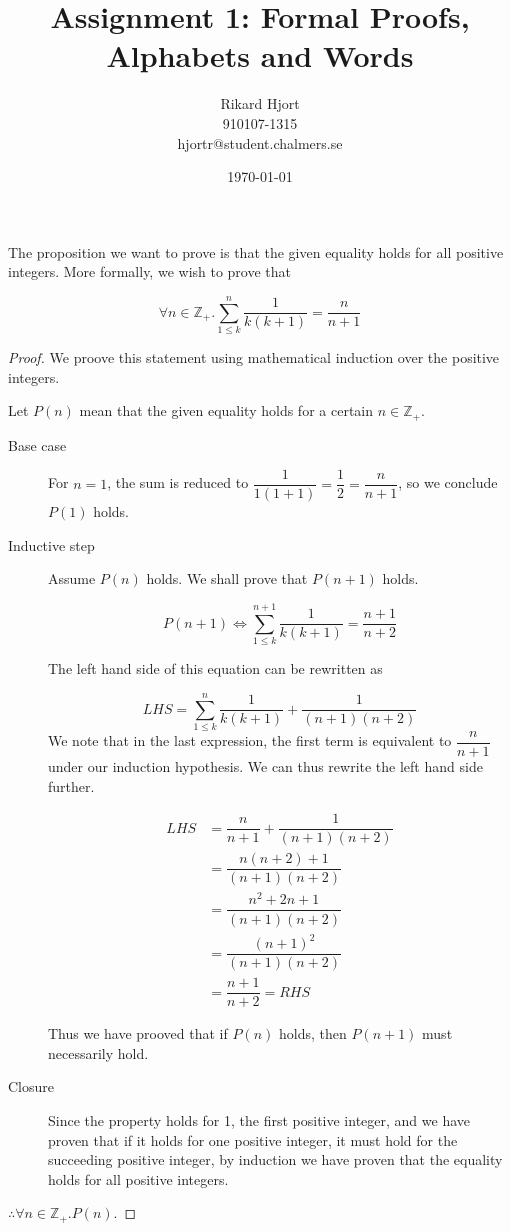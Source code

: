 \documentclass{article}
\title{Assignment 1: Formal Proofs, Alphabets and Words}
\date{\today}
\author{Rikard Hjort\\910107-1315\\hjortr@student.chalmers.se}
\begin{document}
\maketitle
{}


\section{}
The proposition we want to prove is that the given equality holds for all positive integers. More formally, we wish to prove that

$$\forall n \in \mathbb{Z}_+ . \sum_{1\leq k}^n \dfrac{1}{k(k+1)} = \dfrac{n}{n+1}$$

\begin{proof}
    We proove this statement using mathematical induction over the positive integers. 

    Let $P(n)$ mean that the given equality holds for a certain $n \in \mathbb{Z}_+$.

    \begin{description}
        \item[Base case] 
            For $n = 1$, the sum is reduced to $\dfrac{1}{1(1+1)} = \dfrac{1}{2} = \dfrac{n}{n+1}$, so we conclude $P(1)$ holds.
        \item[Inductive step] 
            Assume $P(n)$ holds. We shall prove that $P(n+1)$ holds.

            $$P(n+1) \Leftrightarrow \sum_{1\leq k}^{n+1} \dfrac{1}{k(k+1)} = \dfrac{n+1}{n+2}$$

            The left hand side of this equation can be rewritten as

            $$LHS = \sum_{1\leq k}^{n} \dfrac{1}{k(k+1)} + \dfrac{1}{(n+1)(n+2)}$$
            We note that in the last expression, the first term is equivalent to $\dfrac{n}{n+1}$ under our induction hypothesis. We can thus rewrite the left hand side further.

            \begin{align*}
                LHS &= \dfrac{n}{n+1} + \dfrac{1}{(n+1)(n+2)} \\
                    &= \dfrac{n(n+2) + 1}{(n+1)(n+2)} \\
                    &= \dfrac{n^2 + 2n + 1}{(n+1)(n+2)} \\
                    &= \dfrac{(n+1)^2}{(n+1)(n+2)}\\
                    &= \dfrac{n+1}{n+2} = RHS
            \end{align*} 

            Thus we have prooved that if $P(n)$ holds, then $P(n+1)$ must necessarily hold.

        \item[Closure] 
            Since the property holds for 1, the first positive integer, and we have proven that if it holds for one positive integer, it must hold for the succeeding positive integer, by induction we have proven that the equality holds for all positive integers.
    \end{description}

    $\therefore \forall n \in \mathbb{Z}_+ . P(n)$.
\end{proof}
\end{document}
